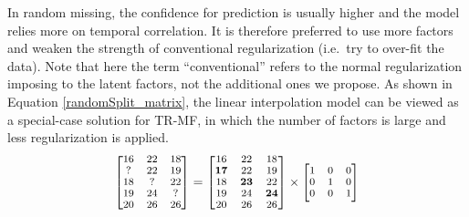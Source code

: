 In random missing, the confidence for prediction is usually higher and the model relies more on temporal correlation.
It is therefore preferred to use more factors and weaken the strength of conventional regularization (i.e.\ try to over-fit the data).
Note that here the term ``conventional'' refers to the normal regularization imposing to the latent factors, not the additional ones we propose. 
As shown in Equation \ref{randomSplit_matrix}, the linear interpolation model can be viewed as a special-case solution for TR-MF, in which the number of factors is large and less regularization is applied. 
\begin{equation}
\small
\label{randomSplit_matrix}
\begin{bmatrix}
16 & 22 & 18\\
 ? & 22 & 19\\
18 &  ?	& 22\\
19 & 24 &  ?\\
20 & 26 & 26\\
\end{bmatrix} 
= 
\begin{bmatrix}
16 & 22 & 18\\
\mathbf{17} & 22 & 19\\
18 & \mathbf{23}	& 22\\
19 & 24 & \mathbf{24}\\
20 & 26 & 26\\
\end{bmatrix} 
\times
\begin{bmatrix}
1 & 0 & 0\\
0 & 1 & 0\\
0 & 0 & 1\\
\end{bmatrix} 
\end{equation}

